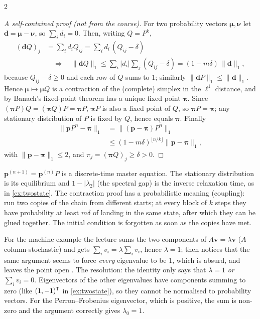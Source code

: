 \begin{paracol}{2}
\begin{proof}[A self-contained proof (not from the course)]
For two probability vectors $\bm\mu,\bm\nu$ let $\bm d=\bm\mu-\bm\nu$, so
$\sum_id_i=0$. Then, writing $Q=P^k$,
\begin{align*}
  (\bm dQ)_j&=\sum_id_iQ_{ij}=\sum_id_i\,(Q_{ij}-\delta)\\
  &\quad\Rightarrow\quad
  \|\bm dQ\|_1\le\sum_i|d_i|\sum_j(Q_{ij}-\delta)=(1-m\delta)\,\|\bm d\|_1,
\end{align*}
because $Q_{ij}-\delta\ge0$ and each row of $Q$ sums to $1$; similarly
$\|\bm dP\|_1\le\|\bm d\|_1$. Hence $\bm\mu\mapsto\bm\mu Q$ is a contraction
of the (complete) simplex in the $\ell^1$ distance, and by Banach's
fixed-point theorem has a unique fixed point $\bm\pi$. Since
$(\bm\pi P)Q=(\bm\pi Q)P=\bm\pi P$, $\bm\pi P$ is also a fixed point of
$Q$, so $\bm\pi P=\bm\pi$; any stationary distribution of $P$ is fixed
by $Q$, hence equals $\bm\pi$. Finally
\begin{align*}
  \|\bm pP^n-\bm\pi\|_1&=\|(\bm p-\bm\pi)P^n\|_1\\
  &\le(1-m\delta)^{\lfloor n/k\rfloor}\|\bm p-\bm\pi\|_1,
\end{align*}
with $\|\bm p-\bm\pi\|_1\le2$, and $\pi_j=(\bm\pi Q)_j\ge\delta>0$.
\end{proof}

\begin{intuition}
$\bm p^{(n+1)}=\bm p^{(n)}P$ is a discrete-time master equation. The stationary distribution is its
equilibrium and $1-|\lambda_2|$ (the spectral gap) is the inverse relaxation time, as in \cref{ex:twostate}.
The contraction proof has a probabilistic meaning (coupling): run two copies of the chain from different
starts; at every block of $k$ steps they have probability at least $m\delta$ of landing in the same state,
after which they can be glued together. The initial condition is forgotten as soon as the copies have
met.
\end{intuition}

\begin{coursenote}
For the machine example the lecture sums the two components of $A\bm v=\lambda\bm v$ ($A$ column-stochastic)
and gets $\sum_iv_i=\lambda\sum_iv_i$, hence $\lambda=1$; then notices that the same argument seems to
force \emph{every} eigenvalue to be $1$, which is absurd, and leaves the point open . The
resolution: the identity only says that $\lambda=1$ \emph{or} $\sum_iv_i=0$. Eigenvectors of the other
eigenvalues have components summing to zero (like $(1,-1)^{\mathsf T}$ in \cref{ex:twostate}), so they cannot be
normalised to probability vectors. For the Perron--Frobenius eigenvector, which is positive, the sum is
non-zero and the argument correctly gives $\lambda_0=1$.
\end{coursenote}


\end{paracol}
